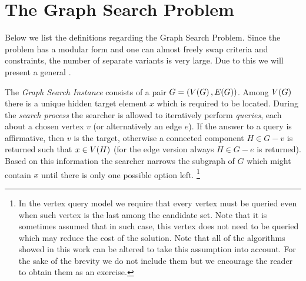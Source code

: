 \section{The Graph Search Problem}
\label{sec:graph_search_problem}

Below we list the definitions regarding the Graph Search Problem.  Since the problem has a modular form and one can almost freely swap criteria and constraints, the number of separate variants is very large. Due to this we will present a general . 

The \textit{Graph Search Instance} consists of a pair $G=\mathopen{}\left( V\mathopen{}\left( G \right),E\mathopen{}\left( G \right) \right)$. Among $V\mathopen{}\left( G \right)$ there is a unique hidden target element $x$ which is required
to be located. During the \textit{search process} the searcher is allowed to iteratively perform \textit{queries}, each about a chosen vertex $v$ (or alternatively an edge $e$). If the answer to a query is affirmative, then $v$ is the target, otherwise a connected component $H\in G-v$ is returned such that $x\in V\mathopen{}\left( H \right)$ (for the edge version always $H\in G-e$ is returned). Based on this information the searcher narrows the subgraph of $G$ which might contain $x$ until there is only one possible option left. \footnote{In the vertex query model we require that every vertex must be queried even when such vertex is the last among the candidate set. Note that it is sometimes assumed that in such case, this vertex does not need to be queried which may reduce the cost of the solution. Note that all of the algorithms showed in this work can be altered to take this assumption into account. For the sake of the brevity we do not include them but we encourage the reader to obtain them as an exercise.}


